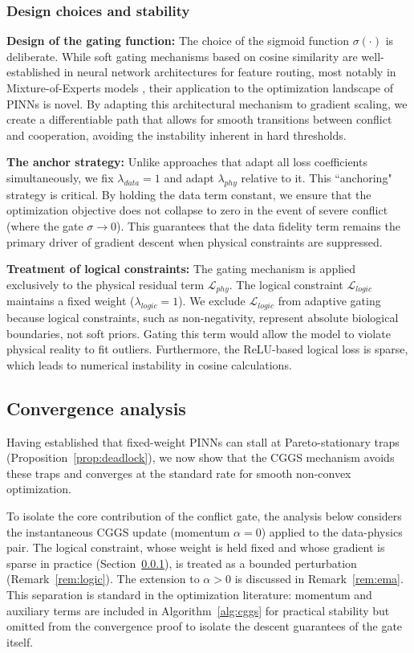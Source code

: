 \documentclass[11pt]{article}
\begin{document}
\subsubsection{Design choices and stability}\label{sec:design}
\textbf{Design of the gating function:} The choice of the sigmoid function $\sigma(\cdot)$ is deliberate. While soft gating mechanisms based on cosine similarity are well-established in neural network architectures for feature routing, most notably in Mixture-of-Experts models \cite{shazeer2017outrageously}, their application to the optimization landscape of PINNs is novel. By adapting this architectural mechanism to gradient scaling, we create a differentiable path that allows for smooth transitions between conflict and cooperation, avoiding the instability inherent in hard thresholds.

\textbf{The anchor strategy:} Unlike approaches that adapt all loss coefficients simultaneously, we fix $\lambda_{data} = 1$ and adapt $\lambda_{phy}$ relative to it. This ``anchoring" strategy is critical. By holding the data term constant, we ensure that the optimization objective does not collapse to zero in the event of severe conflict (where the gate $\sigma \to 0$). This guarantees that the data fidelity term remains the primary driver of gradient descent when physical constraints are suppressed.

\textbf{Treatment of logical constraints:} The gating mechanism is applied exclusively to the physical residual term $\mathcal{L}_{phy}$. The logical constraint $\mathcal{L}_{logic}$ maintains a fixed weight ($\lambda_{logic}=1$). We exclude $\mathcal{L}_{logic}$ from adaptive gating because logical constraints, such as non-negativity, represent absolute biological boundaries, not soft priors. Gating this term would allow the model to violate physical reality to fit outliers. Furthermore, the ReLU-based logical loss is sparse, which leads to numerical instability in cosine calculations.


\subsection{Convergence analysis}\label{sec:convergence}

Having established that fixed-weight PINNs can stall at Pareto-stationary traps (Proposition~\ref{prop:deadlock}), we now show that the CGGS mechanism avoids these traps and converges at the standard rate for smooth non-convex optimization.

To isolate the core contribution of the conflict gate, the analysis below considers the instantaneous CGGS update (momentum $\alpha = 0$) applied to the data-physics pair. The logical constraint, whose weight is held fixed and whose gradient is sparse in practice (Section~\ref{sec:design}), is treated as a bounded perturbation (Remark~\ref{rem:logic}). The extension to $\alpha > 0$ is discussed in Remark~\ref{rem:ema}. This separation is standard in the optimization literature: momentum and auxiliary terms are included in Algorithm~\ref{alg:cggs} for practical stability but omitted from the convergence proof to isolate the descent guarantees of the gate itself.
\end{document}
